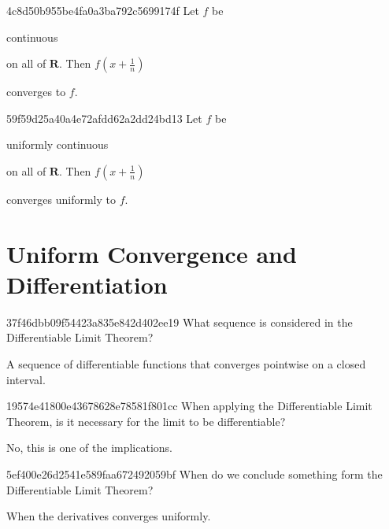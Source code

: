 \begin{note}{4c8d50b955be4fa0a3ba792c5699174f}
    Let \({ f }\) be \begin{icloze}{2}continuous\end{icloze} on all of \({ \mathbf{R} }\).
    Then \({ f(x + \frac{1}{n}) }\) \begin{icloze}{1}converges to \({ f }\).\end{icloze}
\end{note}

\begin{note}{59f59d25a40a4e72afdd62a2dd24bd13}
    Let \({ f }\) be \begin{icloze}{2}uniformly continuous\end{icloze} on all of \({ \mathbf{R} }\).
    Then \({ f(x + \frac{1}{n}) }\) \begin{icloze}{1}converges uniformly to \({ f }\).\end{icloze}
\end{note}

\section{Uniform Convergence and Differentiation} %
\begin{note}{37f46dbb09f54423a835e842d402ee19}
    What sequence is considered in the Differentiable Limit Theorem?

    \begin{cloze}{1}
        A sequence of differentiable functions that converges point\-wise on a closed interval.
    \end{cloze}
\end{note}

\begin{note}{19574e41800e43678628e78581f801cc}
    When applying the Differentiable Limit Theorem, is it necessary for the limit to be differentiable?

    \begin{cloze}{1}
        No, this is one of the implications.
    \end{cloze}
\end{note}

\begin{note}{5ef400e26d2541e589faa672492059bf}
    When do we conclude something form the Differentiable Limit Theorem?

    \begin{cloze}{1}
        When the derivatives converges uniformly.
    \end{cloze}
\end{note}

